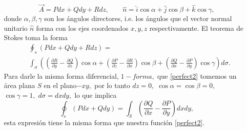 \documentclass{article}
\theoremstyle{definition} \newtheorem{defi}{Definici\'on}
\theoremstyle{definition} \newtheorem{teo}{Teorema}
\theoremstyle{definition} \newtheorem{cor}{Corolario}
\begin{document}
\begin{equation}
\vec A = Pdx+Qdy+Rdz, \qquad \hat n =\hat i\cos \alpha +\hat j \cos \beta +\hat k \cos \gamma,
\end{equation}
donde $\alpha, \beta, \gamma$ son los \'angulos directores, i.e. los \'angulos que el vector normal unitario $\hat n$ forma con los ejes coordenados $x,y,z$ respectivamente. El teorema de Stokes toma la forma
\begin{align}
&\oint_s\left(Pdx+Qdy+Rdz\right) = \\
&\int_\sigma\left(\left(\frac{\partial R}{\partial y}-\frac{\partial Q}{\partial z}\right)\cos\alpha+\left(\frac{\partial P}{\partial z}-\frac{\partial R}{\partial x}\right)\cos\beta+\left(\frac{\partial Q}{\partial x}-\frac{\partial P}{\partial y}\right)\cos\gamma\right)d\sigma.
\end{align}
Para darle la misma forma diferencial, $1-forma,$ que \eqref{perfect2} tomemos un \'area plana $S$ en el plano$-xy,$ por lo tanto $dz=0,$ $\cos \alpha = \cos \beta = 0,$ $\cos \gamma = 1,$ $d\sigma = dxdy,$ lo que implica
\begin{equation}
\oint_s\left(Pdx+Qdy\right)=\int_S\left(\frac{\partial Q}{\partial x}-\frac{\partial P}{\partial y}\right)dxdy,
\end{equation}
esta expresi\'on tiene la misma forma que nuestra funci\'on \eqref{perfect2}.
\end{document}
